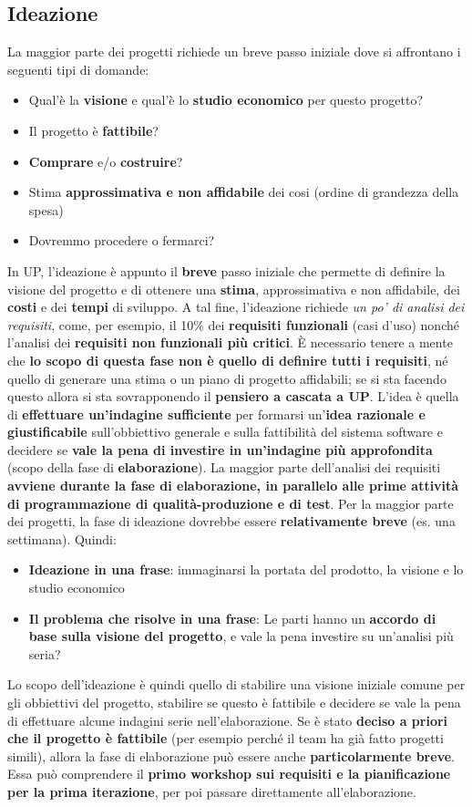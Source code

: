 \documentclass[12pt]{article}
\begin{document}
\subsection{Ideazione}
La maggior parte dei progetti richiede un breve passo iniziale dove si affrontano i seguenti tipi di domande:
\begin{itemize}
    \item Qual'è la \textbf{visione} e qual'è lo \textbf{studio economico} per questo progetto?
    \item Il progetto è \textbf{fattibile}?
    \item \textbf{Comprare} e/o \textbf{costruire}?
    \item Stima \textbf{approssimativa e non affidabile} dei cosi (ordine di grandezza della spesa)
    \item Dovremmo procedere o fermarci?
\end{itemize}
In UP, l'ideazione è appunto il \textbf{breve} passo iniziale che permette di definire la visione del progetto e di ottenere una \textbf{stima}, approssimativa e non affidabile, dei \textbf{costi} e dei \textbf{tempi} di sviluppo.
A tal fine, l'ideazione richiede \textit{un po' di analisi dei requisiti}, come, per esempio, il 10\% dei \textbf{requisiti funzionali} (casi d'uso) nonché l'analisi dei \textbf{requisiti non funzionali più critici}.
È necessario tenere a mente che \textbf{lo scopo di questa fase non è quello di definire tutti i requisiti}, né quello di generare una stima o un piano di progetto affidabili; se si sta facendo questo allora si sta sovrapponendo il \textbf{pensiero a cascata a UP}.
L'idea è quella di \textbf{effettuare un'indagine sufficiente} per formarsi un'\textbf{idea razionale e giustificabile} sull'obbiettivo generale e sulla fattibilità del sistema software e decidere se \textbf{vale la pena di investire in un'indagine più approfondita} (scopo della fase di \textbf{elaborazione}).
La maggior parte dell'analisi dei requisiti \textbf{avviene durante la fase di elaborazione, in parallelo alle prime attività di programmazione di qualità-produzione e di test}.
Per la maggior parte dei progetti, la fase di ideazione dovrebbe essere \textbf{relativamente breve} (es. una settimana).
Quindi:
\begin{itemize}
    \item \textbf{Ideazione in una frase}: immaginarsi la portata del prodotto, la visione e lo studio economico
    \item \textbf{Il problema che risolve in una frase}: Le parti hanno un \textbf{accordo di base sulla visione del progetto}, e vale la pena investire su un'analisi più seria?
\end{itemize}
Lo scopo dell'ideazione è quindi quello di stabilire una visione iniziale comune per gli obbiettivi del progetto, stabilire se questo è fattibile e decidere se vale la pena di effettuare alcune indagini serie nell'elaborazione.
Se è stato \textbf{deciso a priori che il progetto è fattibile} (per esempio perché il team ha già fatto progetti simili), allora la fase di elaborazione può essere anche \textbf{particolarmente breve}. 
Essa può comprendere il \textbf{primo workshop sui requisiti e la pianificazione per la prima iterazione}, per poi passare direttamente all'elaborazione.
\end{document}
